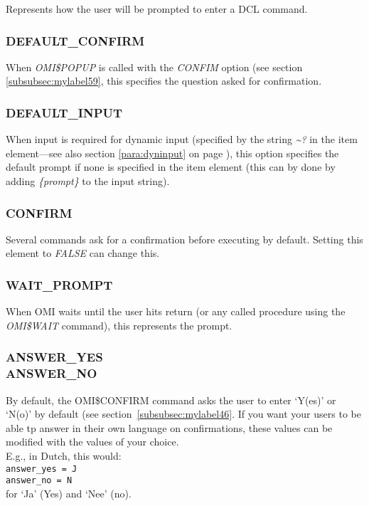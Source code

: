 \documentclass[a4paper]{book}
\renewcommand{\indent}{\hspace*{5mm}}
\begin{document}
Represents how the user will be prompted to enter a DCL command.

\subsubsection{DEFAULT{\_}CONFIRM}\label{para:defconfirm}

When \textsl{OMI{\$}POPUP} is called with the \textsl{CONFIM} option (see section \ref{subsubsec:mylabel59}, this specifies the question asked for confirmation.

\subsubsection{DEFAULT{\_}INPUT}

When input is required for dynamic input (specified by the string \textsl{\~{}?} in the item 
element---see also section \ref{para:dyninput} on page \pageref{para:dyninput}),
this option specifies the default prompt if none is specified in 
the item element (this can by done by adding \textsl{{\{}\textit{prompt}{\}}} to the input string).

\subsubsection{CONFIRM}
\label{para:confirmput}

Several commands ask for a confirmation
before executing by default. Setting this element to \textsl{FALSE} can change this.

\subsubsection{WAIT{\_}PROMPT}

When OMI waits until the user hits return (or any called procedure using the 
\textsl{OMI{\$}WAIT} command), this 
represents the prompt.

\subsubsection{ANSWER{\_}YES\\ANSWER{\_}NO}

By default, the \textsf{OMI{\$}CONFIRM} command asks the user to enter `Y(es)' or `N(o)' by
default (see section~\ref{subsubsec:mylabel46}. If you want your users to be able tp
answer in their own language on confirmations, these values can be modified with the
values of your choice.\\
E.g., in Dutch, this would: \\
\indent\texttt{answer{\_}yes = J}\\
\indent\texttt{answer{\_}no = N}\\
for `Ja' (Yes) and `Nee' (no).
\end{document}
